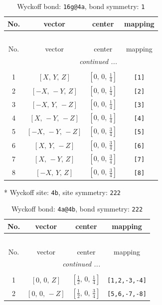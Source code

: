 \documentclass[fleqn,8pt]{jsarticle}
\begin{document}
\renewcommand{\arraystretch}{1.2}
\begin{longtable}{cccc}
\caption{Wyckoff bond: {\tt 16g@4a}, bond symmetry: {\tt 1}}
 \\
 \hline \hline
No. & vector & center & mapping \\ \hline \endfirsthead

\multicolumn{3}{l}{\tablename\ \thetable{}} \\
 \hline \hline
No. & vector & center & mapping \\ \hline \endhead

 \hline \hline
\multicolumn{3}{r}{\footnotesize\it continued ...} \\ \endfoot

 \hline \hline
\multicolumn{3}{r}{} \\ \endlastfoot

1 & $\left[ X,\, Y,\, Z \right]$ & $\left[ 0,\, 0,\, \frac{1}{4} \right]$ & {\tt [1]} \\ \hline
2 & $\left[ - X,\, - Y,\, Z \right]$ & $\left[ 0,\, 0,\, \frac{1}{4} \right]$ & {\tt [2]} \\ \hline
3 & $\left[ - X,\, Y,\, - Z \right]$ & $\left[ 0,\, 0,\, \frac{1}{4} \right]$ & {\tt [3]} \\ \hline
4 & $\left[ X,\, - Y,\, - Z \right]$ & $\left[ 0,\, 0,\, \frac{1}{4} \right]$ & {\tt [4]} \\ \hline
5 & $\left[ - X,\, - Y,\, - Z \right]$ & $\left[ 0,\, 0,\, \frac{3}{4} \right]$ & {\tt [5]} \\ \hline
6 & $\left[ X,\, Y,\, - Z \right]$ & $\left[ 0,\, 0,\, \frac{3}{4} \right]$ & {\tt [6]} \\ \hline
7 & $\left[ X,\, - Y,\, Z \right]$ & $\left[ 0,\, 0,\, \frac{3}{4} \right]$ & {\tt [7]} \\ \hline
8 & $\left[ - X,\, Y,\, Z \right]$ & $\left[ 0,\, 0,\, \frac{3}{4} \right]$ & {\tt [8]} \\
\end{longtable}
* Wyckoff site: {\tt 4b}, site symmetry: {\tt 222}
\renewcommand{\arraystretch}{1.2}
\begin{longtable}{cccc}
\caption{Wyckoff bond: {\tt 4a@4b}, bond symmetry: {\tt 222}}
 \\
 \hline \hline
No. & vector & center & mapping \\ \hline \endfirsthead

\multicolumn{3}{l}{\tablename\ \thetable{}} \\
 \hline \hline
No. & vector & center & mapping \\ \hline \endhead

 \hline \hline
\multicolumn{3}{r}{\footnotesize\it continued ...} \\ \endfoot

 \hline \hline
\multicolumn{3}{r}{} \\ \endlastfoot

1 & $\left[ 0,\, 0,\, Z \right]$ & $\left[ \frac{1}{2},\, 0,\, \frac{1}{4} \right]$ & {\tt [1,2,-3,-4]} \\ \hline
2 & $\left[ 0,\, 0,\, - Z \right]$ & $\left[ \frac{1}{2},\, 0,\, \frac{3}{4} \right]$ & {\tt [5,6,-7,-8]} \\
\end{longtable}
\end{document}
